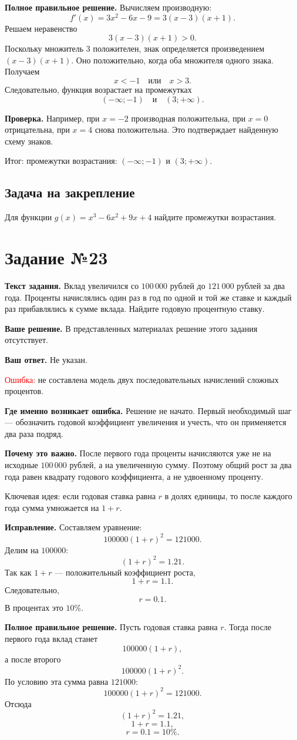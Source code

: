 \documentclass[12pt,a4paper]{article}
\newcommand{\err}{\textcolor{red}{Ошибка:}}
\newcommand{\idea}{\textcolor{blue!60!black}{Ключевая идея:}}
\newcommand{\result}{\textcolor{teal!60!black}{Итог:}}
\newcommand{\tasktitle}[1]{\phantomsection\label{task:#1}\section*{Задание №#1}}
\begin{document}
\textbf{Полное правильное решение.} Вычисляем производную:
\[
f'(x)=3x^2-6x-9=3(x-3)(x+1).
\]
Решаем неравенство
\[
3(x-3)(x+1)>0.
\]
Поскольку множитель $3$ положителен, знак определяется произведением $(x-3)(x+1)$. Оно положительно, когда оба множителя одного знака. Получаем
\[
x<-1\quad\text{или}\quad x>3.
\]
Следовательно, функция возрастает на промежутках
\[
(-\infty;-1)\quad\text{и}\quad(3;+\infty).
\]

\textbf{Проверка.} Например, при $x=-2$ производная положительна, при $x=0$ отрицательна, при $x=4$ снова положительна. Это подтверждает найденную схему знаков.

\result{} промежутки возрастания: $(-\infty;-1)$ и $(3;+\infty)$.

\subsection*{Задача на закрепление}
Для функции $g(x)=x^3-6x^2+9x+4$ найдите промежутки возрастания.

\newpage
\tasktitle{23}
\textbf{Текст задания.} Вклад увеличился со $100\,000$ рублей до $121\,000$ рублей за два года. Проценты начислялись один раз в год по одной и той же ставке и каждый раз прибавлялись к сумме вклада. Найдите годовую процентную ставку.

\textbf{Ваше решение.} В представленных материалах решение этого задания отсутствует.

\textbf{Ваш ответ.} Не указан.

\err{} не составлена модель двух последовательных начислений сложных процентов.

\textbf{Где именно возникает ошибка.} Решение не начато. Первый необходимый шаг --- обозначить годовой коэффициент увеличения и учесть, что он применяется два раза подряд.

\textbf{Почему это важно.} После первого года проценты начисляются уже не на исходные $100\,000$ рублей, а на увеличенную сумму. Поэтому общий рост за два года равен квадрату годового коэффициента, а не удвоенному проценту.

\idea{} если годовая ставка равна $r$ в долях единицы, то после каждого года сумма умножается на $1+r$.

\textbf{Исправление.} Составляем уравнение:
\[
100000(1+r)^2=121000.
\]
Делим на $100000$:
\[
(1+r)^2=1.21.
\]
Так как $1+r$ --- положительный коэффициент роста,
\[
1+r=1.1.
\]
Следовательно,
\[
r=0.1.
\]
В процентах это $10\%$.

\textbf{Полное правильное решение.} Пусть годовая ставка равна $r$. Тогда после первого года вклад станет
\[
100000(1+r),
\]
а после второго
\[
100000(1+r)^2.
\]
По условию эта сумма равна $121000$:
\[
100000(1+r)^2=121000.
\]
Отсюда
\[
(1+r)^2=1.21,
\]
\[
1+r=1.1,
\]
\[
r=0.1=10\%.
\]
\end{document}
